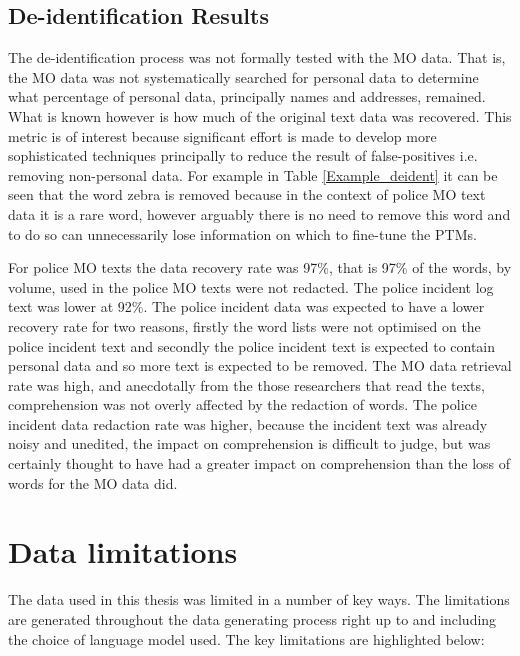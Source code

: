 \subsection{De-identification Results} The de-identification process was not formally tested with the MO data. That is, the MO data  was not systematically searched for personal data to determine what percentage of personal data, principally names and addresses, remained. What is known however is how much of the original text data was recovered. This metric is of interest because significant effort is made to develop more sophisticated techniques principally to reduce the result of false-positives i.e. removing non-personal data.  For example in Table \ref{Example_deident} it can be seen that the word zebra is removed because in the context of police MO text data it is a rare word, however arguably there is no need to remove this word and to do so can unnecessarily lose information on which to fine-tune the PTMs. 

For police MO texts the data recovery rate was 97\%, that is 97\% of the words, by volume,  used in the police MO texts were not redacted. The police incident log  text was lower at 92\%. The police incident data was expected to have a lower recovery rate for two reasons, firstly the word lists were not optimised on the police incident text and secondly the police incident text is expected to contain personal data and so more text is expected to be removed. The MO data retrieval rate was high, and anecdotally from the those researchers that read the texts, comprehension was not overly affected by the redaction of words. The police incident data redaction rate was higher, because the incident text was already noisy and unedited, the impact on comprehension is difficult to judge, but was certainly thought to have had a greater impact on comprehension than the loss of words for the MO data did.  

\section{Data limitations} The data used in this thesis was limited in a number of key ways. The limitations are generated throughout the data generating process right up to and including the choice of language model used. The key limitations are highlighted below:

